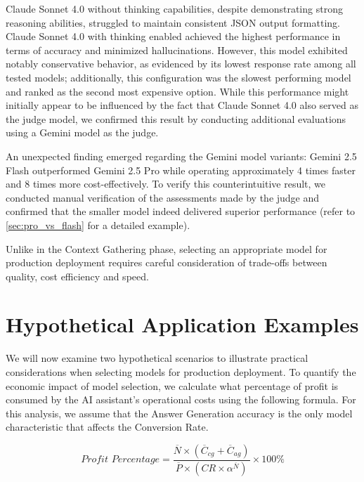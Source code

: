 Claude Sonnet 4.0 without thinking capabilities, despite demonstrating strong reasoning abilities, struggled to maintain consistent JSON output formatting.
Claude Sonnet 4.0 with thinking enabled achieved the highest performance in terms of accuracy and minimized hallucinations.
However, this model exhibited notably conservative behavior, as evidenced by its lowest response rate among all tested models; additionally, this configuration was the slowest performing model and ranked as the second most expensive option.
While this performance might initially appear to be influenced by the fact that Claude Sonnet 4.0 also served as the judge model, we confirmed this result by conducting additional evaluations using a Gemini model as the judge.

An unexpected finding emerged regarding the Gemini model variants: Gemini 2.5 Flash outperformed Gemini 2.5 Pro while operating approximately 4 times faster and 8 times more cost-effectively.
To verify this counterintuitive result, we conducted manual verification of the assessments made by the judge and confirmed that the smaller model indeed delivered superior performance (refer to \cref{sec:pro_vs_flash} for a detailed example).

Unlike in the Context Gathering phase, selecting an appropriate model for production deployment requires careful consideration of trade-offs between quality, cost efficiency and speed.

\section{Hypothetical Application Examples}
\label{sec:hypothetical}

We will now examine two hypothetical scenarios to illustrate practical considerations when selecting models for production deployment.
To quantify the economic impact of model selection, we calculate what percentage of profit is consumed by the AI assistant's operational costs using the following formula.
For this analysis, we assume that the Answer Generation accuracy is the only model characteristic that affects the Conversion Rate.

\newcommand{\avgMessages}{\overline{N}}
\newcommand{\avgCostCG}{\overline{C}_{cg}}
\newcommand{\avgCostAG}{\overline{C}_{ag}}
\newcommand{\avgProfit}{\overline{P}}
\newcommand{\convRate}{\textit{CR}}
\newcommand{\modelAccuracy}{\alpha}

\[
    \textit{Profit Percentage} = \frac{\avgMessages \times (\avgCostCG + \avgCostAG)}{\avgProfit \times (\convRate \times \modelAccuracy^{\avgMessages})} \times 100\%
\]

